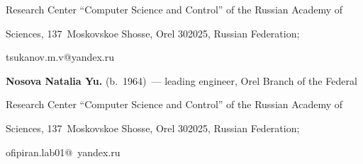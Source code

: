 Research Center ``Computer Science and Control'' of the Russian Academy of 


Sciences, 137~Moskovskoe Shosse, Orel 302025, Russian Federation; 


\mbox{tsukanov.m.v@yandex.ru}





\vspace*{3pt}


      


      \noindent


\textbf{Nosova Natalia Yu.} (b.\ 1964)~--- leading engineer, Orel Branch of the Federal 


Research Center ``Computer Science and Control'' of the Russian Academy of 


Sciences, 137~Moskovskoe Shosse, Orel 302025, Russian Federation; 


\mbox{ofipiran.lab01@ yandex.ru}


  


\label{end\stat}





\renewcommand{\bibname}{\protect\rm Литература} 


      


